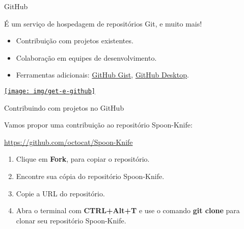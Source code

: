 \documentclass[a4paper]{beamer}
\begin{document}
\begin{frame}{GitHub}

É um serviço de hospedagem de repositórios Git, e muito mais!

\begin{itemize}
\item Contribuição com projetos existentes.
\item Colaboração em equipes de desenvolvimento.
\item Ferramentas adicionais: \href{https://gist.github.com/}{GitHub Gist}, \href{https://desktop.github.com/}{GitHub Desktop}.
\end{itemize}

\begin{center}
\href{https://github.com/}{\texttt{[image: img/get-e-github]}}
\end{center}

\end{frame}

\begin{frame}{Contribuindo com projetos no GitHub}

Vamos propor uma contribuição ao repositório Spoon-Knife:
\begin{center}
\url{https://github.com/octocat/Spoon-Knife}
\end{center}

\begin{enumerate}
\item Clique em \textbf{Fork}, para copiar o repositório.
\item Encontre sua cópia do repositório Spoon-Knife.
\item Copie a URL do repositório.
\item Abra o terminal com \textbf{CTRL+Alt+T} e use o comando \textbf{git clone} para clonar seu repositório Spoon-Knife.
\end{enumerate}

\end{frame}
\end{document}
